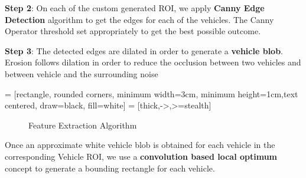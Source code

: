 \documentclass[a4paper,12pt]{article}
\begin{document}
\begin{flushleft}
\textbf{Step 2}: On each of the custom generated ROI, we apply \textbf{Canny Edge Detection} algorithm to get the edges for each of the vehicles. The Canny Operator threshold set appropriately to get the best possible outcome.
\end{flushleft}

\begin{flushleft}
\textbf{Step 3}: The detected edges are dilated in order to generate a \textbf{vehicle blob}. Erosion follows dilation in order to reduce the occlusion between two vehicles and between vehicle and the surrounding noise
\end{flushleft}

 = [rectangle, rounded corners, minimum width=3cm, minimum height=1cm,text centered, draw=black, fill=white]
 = [thick,->,>=stealth]

\begin{figure}[!ht]
\centering
\caption{Feature Extraction Algorithm}
\vspace{0.1in}

\end{figure}

\begin{flushleft}
Once an approximate white vehicle blob is obtained for each vehicle in the corresponding Vehicle ROI, we use a \textbf{convolution based local optimum} concept to generate a bounding rectangle for each vehicle.
\end{flushleft}
\end{document}
